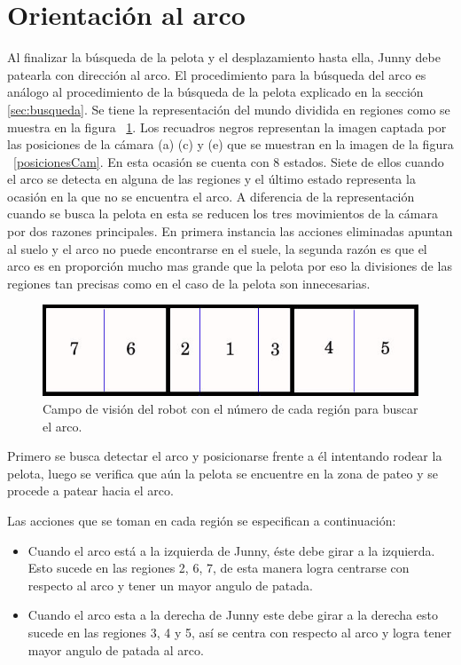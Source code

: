 \section{Orientaci\'on al arco}

Al finalizar la búsqueda de la pelota y el desplazamiento hasta ella, Junny debe patearla con dirección al arco. El procedimiento para la búsqueda del arco es an\'alogo al procedimiento de la b\'usqueda de la pelota explicado en la sección \ref{sec:busqueda}.
Se tiene la representación del mundo dividida en regiones como se muestra en la figura ~\ref{divisionCamArco}. Los recuadros negros representan la imagen captada por las posiciones de la cámara (a) (c) y (e) que se muestran en la imagen de la figura ~\ref{posicionesCam}. En esta ocasi\'on se cuenta con 8 estados. Siete de ellos cuando el arco se detecta en alguna de las regiones y el último estado representa la ocasión en la que no se encuentra el arco. 
A diferencia de la representaci\'on cuando se busca la pelota en esta se reducen los tres movimientos de la c\'amara por dos razones principales. En primera instancia las acciones eliminadas apuntan al suelo y el arco no puede encontrarse en el suele, la segunda raz\'on es que el arco es en proporci\'on mucho mas grande que la pelota por eso la divisiones de las regiones tan precisas como en el caso de la pelota son innecesarias.
\begin{figure}[hbtp]
\centering
\includegraphics[scale=0.5]{imagenes/RegionesArco.jpg}
\caption{Campo de visión del robot con el número de cada región para buscar el arco. }
\label{divisionCamArco}
\end{figure}

Primero se busca detectar el arco y posicionarse frente a él intentando rodear la pelota, luego se verifica que a\'un la pelota se encuentre en la zona de pateo y se procede a patear hacia el arco.

Las acciones que se toman en cada regi\'on se especifican a continuación: 
 \begin{itemize}[noitemsep, nolistsep]

\item Cuando el arco está a la izquierda de Junny, éste debe girar a la izquierda. Esto sucede en las regiones 2, 6, 7, de esta manera logra centrarse con respecto al arco y tener un mayor angulo de patada.

\item Cuando el arco esta a la derecha de Junny este debe girar a la derecha esto sucede en las regiones 3, 4 y 5, así se centra con respecto al arco y logra tener mayor angulo de patada al arco.


\end{itemize}

